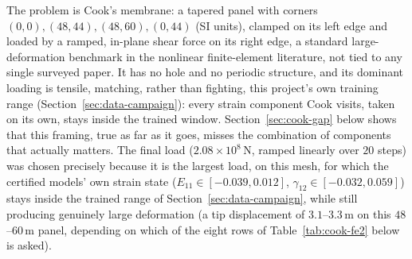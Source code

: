 \documentclass[10pt,a4paper]{article}
\begin{document}
The problem is Cook's membrane: a tapered panel with corners
$(0,0),(48,44),(48,60),(0,44)$ (SI units), clamped on its left edge and
loaded by a ramped, in-plane shear force on its right edge, a standard
large-deformation benchmark in the nonlinear finite-element literature,
not tied to any single surveyed paper. It has no hole and no periodic
structure, and its dominant loading is tensile, matching, rather than
fighting, this project's own training range
(Section~\ref{sec:data-campaign}): every strain component Cook visits,
taken on its own, stays inside the trained window. Section~\ref{sec:cook-gap}
below shows that this framing, true as far as it goes, misses the
combination of components that actually matters. The
final load ($2.08\times10^8\,\mathrm N$, ramped linearly over $20$
steps) was chosen precisely because it is the largest load, on
this mesh, for which the certified models' own strain state
($E_{11}\in[-0.039,0.012]$, $\gamma_{12}\in[-0.032,0.059]$) stays inside
the trained range of Section~\ref{sec:data-campaign}, while still
producing genuinely large deformation (a tip displacement of
$3.1$--$3.3\,\mathrm m$ on this $48$--$60\,\mathrm m$ panel, depending on
which of the eight rows of Table~\ref{tab:cook-fe2} below is asked).
\end{document}

